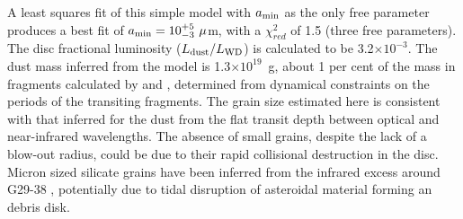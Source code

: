 \documentclass[useAMS,usenatbib]{mn2e}
\begin{document}
A least squares fit of this simple model with $a_{\rm min}$ as the only free parameter produces a best fit of $a_{\rm min} = 10^{+5}_{-3}~\mu$m, with a $\chi^{2}_{red}$ of 1.5 (three free parameters). The disc fractional luminosity ($L_{\rm dust}/L_{\rm WD}$) is calculated to be 3.2$\times10^{-3}$. The dust mass inferred from the model is 1.3$\times10^{19}$~g, about 1 per cent of the mass in fragments calculated by \cite{2015Natur.526..546V} and \citet{2016MNRAS.tmp..406R}, determined from dynamical constraints on the periods of the transiting fragments. The grain size estimated here is consistent with that inferred for the dust from the flat transit depth between optical and near-infrared wavelengths. The absence of small grains, despite the lack of a blow-out radius, could be due to their rapid collisional destruction in the disc. Micron sized silicate grains have been inferred from the infrared excess around G29-38 \citep[e.g.][]{2005ApJ...635L.161R,2009ApJ...693..697R,2009AJ....137.3191J}, potentially due to tidal disruption of asteroidal material forming an debris disk. 
\end{document}
